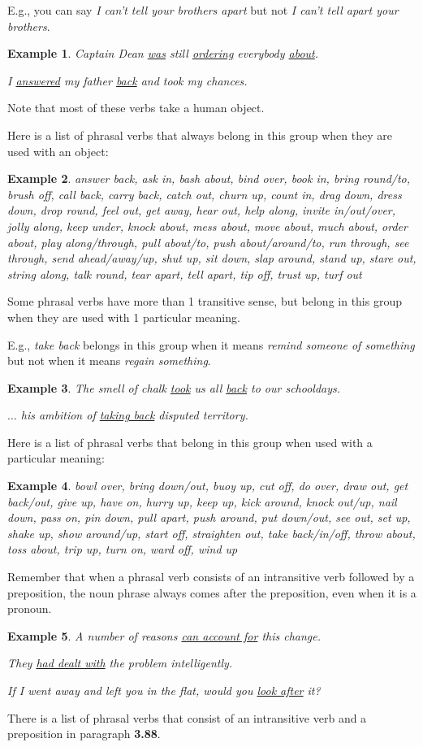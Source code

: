 \documentclass[oneside]{book}
\numberwithin{equation}{section}
\newtheorem{example}{Example}[section]
\begin{document}
E.g., you can say \textit{I can't tell your brothers apart} but not \textit{I can't tell apart your brothers}.
\begin{example}
    Captain Dean \underline{was} still \underline{ordering} everybody \underline{about}.
    
    I \underline{answered} my father \underline{back} and took my chances.
\end{example}
Note that most of these verbs take a human object.

%
Here is a list of phrasal verbs that always belong in this group when they are used with an object:
\begin{example}
    answer back, ask in, bash about, bind over, book in, bring round/to, brush off, call back, carry back, catch out, churn up, count in, drag down, dress down, drop round, feel out, get away, hear out, help along, invite in/out/over, jolly along, keep under, knock about, mess about, move about, much about, order about, play along/through, pull about/to, push about/around/to, run through, see through, send ahead/away/up, shut up, sit down, slap around, stand up, stare out, string along, talk round, tear apart, tell apart, tip off, trust up, turf out
\end{example}
Some phrasal verbs have more than 1 transitive sense, but belong in this group when they are used with 1 particular meaning.

E.g., \textit{take back} belongs in this group when it means \textit{remind someone of something} but not when it means \textit{regain something}.
\begin{example}
    The smell of chalk \underline{took} us all \underline{back} to our schooldays.
    
    $\ldots$ his ambition of \underline{taking back} disputed territory.
\end{example}
Here is a list of phrasal verbs that belong in this group when used with a particular meaning:
\begin{example}
    bowl over, bring down/out, buoy up, cut off, do over, draw out, get back/out, give up, have on, hurry up, keep up, kick around, knock out/up, nail down, pass on, pin down, pull apart, push around, put down/out, see out, set up, shake up, show around/up, start off, straighten out, take back/in/off, throw about, toss about, trip up, turn on, ward off, wind up
\end{example}
%
\noindent{} Remember that when a phrasal verb consists of an intransitive verb followed by a preposition, the noun phrase always comes after the preposition, even when it is a pronoun.
\begin{example}
    A number of reasons \underline{can account for} this change.
    
    They \underline{had dealt with} the problem intelligently.
    
    If I went away and left you in the flat, would you \underline{look after} it?
\end{example}
There is a list of phrasal verbs that consist of an intransitive verb and a preposition in paragraph \textbf{3.88}.
\end{document}

